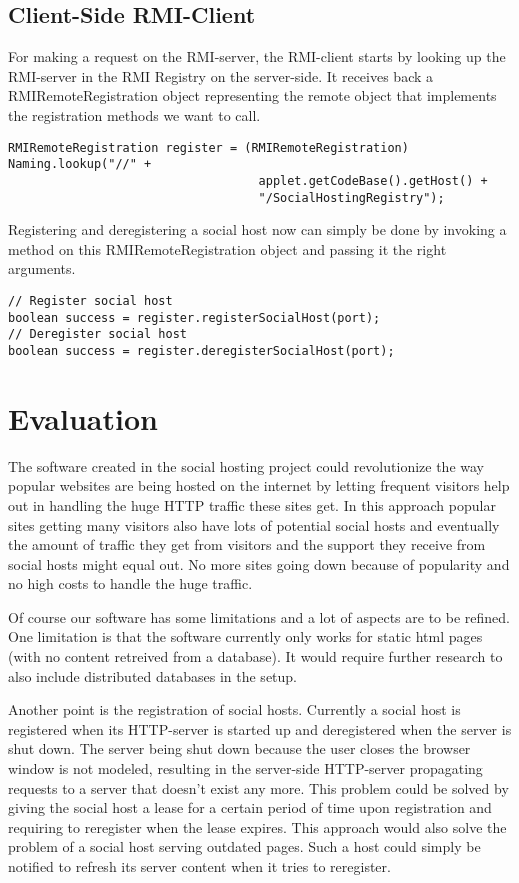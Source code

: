 \documentclass[a4paper, 10pt]{article}
\begin{document}
\subsection{Client-Side RMI-Client}
For making a request on the RMI-server, the RMI-client starts by looking up the RMI-server in the RMI Registry on the server-side. It receives back a RMIRemoteRegistration object representing the remote object that implements the registration methods we want to call.
\begin{lstlisting}
RMIRemoteRegistration register = (RMIRemoteRegistration) Naming.lookup("//" + 
                                   applet.getCodeBase().getHost() +
                                   "/SocialHostingRegistry");
\end{lstlisting}
Registering and deregistering a social host now can simply be done by invoking a method on this RMIRemoteRegistration object and passing it the right arguments.
\begin{lstlisting}
// Register social host
boolean success = register.registerSocialHost(port);
// Deregister social host
boolean success = register.deregisterSocialHost(port);
\end{lstlisting}

\section{Evaluation}
The software created in the social hosting project could revolutionize the way popular websites are being hosted on the internet by letting frequent visitors help out in handling the huge HTTP traffic these sites get. In this approach popular sites getting many visitors also have lots of potential social hosts and eventually the amount of traffic they get from visitors and the support they receive from social hosts might equal out. No more sites going down because of popularity and no high costs to handle the huge traffic.

Of course our software has some limitations and a lot of aspects are to be refined. One limitation is that the software currently only works for static html pages (with no content retreived from a database). It would require further research to also include distributed databases in the setup. 

Another point is the registration of social hosts. Currently a social host is registered when its HTTP-server is started up and deregistered when the server is shut down. The server being shut down because the user closes the browser window is not modeled, resulting in the server-side HTTP-server propagating requests to a server that doesn't exist any more. This problem could be solved by giving the social host a lease for a certain period of time upon registration and requiring to reregister when the lease expires. This approach would also solve the problem of a social host serving outdated pages. Such a host could simply be notified to refresh its server content when it tries to reregister.
\end{document}
